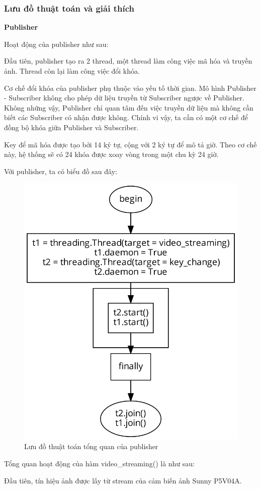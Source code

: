 \documentclass{article}
\begin{document}
\subsubsection{Lưu đồ thuật toán và giải thích}

\textbf{Publisher}

Hoạt động của publisher như sau:

Đầu tiên, publisher tạo ra 2 thread, một thread làm công việc mã hóa và truyền ảnh. Thread còn lại làm công việc đổi khóa.

Cơ chế đổi khóa của publisher phụ thuộc vào yếu tố thời gian. Mô hình Publisher - Subscriber không cho phép dữ liệu truyền từ Subscriber ngược về Publisher. Không những vậy, Publisher chỉ quan tâm đến việc truyền dữ liệu mà không cần biết các Subscriber có nhận được không. Chính vi vậy, ta cần có một cơ chế để đồng bộ khóa giữa Publisher và Subscriber.

Key để mã hóa được tạo bởi 14 ký tự, cộng với 2 ký tự để mô tả giờ. Theo cơ chế này, hệ thống sẽ có 24 khóa được xoay vòng trong một chu kỳ 24 giờ.

Với publisher, ta có biểu đồ sau đây:

\begin{figure}[H]
    \centering
    \includegraphics[width=0.6\linewidth]{pub_main_op.png}
    \caption{Lưu đồ thuật toán tổng quan của publisher}
    \label{fig:pub}
\end{figure}

Tổng quan hoạt động của hàm video\_streaming() là như sau:

Đầu tiên, tín hiệu ảnh được lấy từ stream của cảm biến ảnh Sunny P5V04A.
\end{document}
